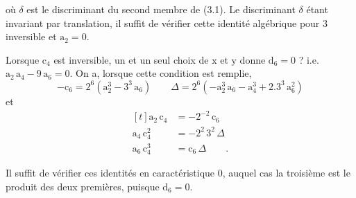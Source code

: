 où $\delta$ est le discriminant du second membre de (3.1). Le discriminant $\delta$ étant invariant par translation, il suffit de vérifier cette identité algébrique pour $3$ inversible et $\mathrm{a}_{2}=0$.

Lorsque $\mathrm{c}_{4}$ est inversible, un et un seul choix de $\mathrm{x}$ et $\mathrm{y}$ donne $\mathrm{d}_{6}=0$ ? i.e. $\mathrm{a}_{2}\,\mathrm{a}_{4}-9\,\mathrm{a}_{6}=0$. On a, lorsque cette condition est remplie,
\[
-\mathrm{c}_{6}=2^{6}(\mathrm{a}_{2}^{3}-3^{3}\,\mathrm{a}_{6})\qquad
\Delta=2^{6}(-\mathrm{a}_{2}^{3}\,\mathrm{a}_{6}-\mathrm{a}_{4}^{3}+2.3^{3}\,\mathrm{a}_{6}^{2})
\tag*{(3.3)}
\]
et
\[
\begin{aligned}[t]
\mathrm{a}_{2}\,\mathrm{c}_{4}&=-2^{-2}\,\mathrm{c}_{6}\\
\mathrm{a}_{4}\,\mathrm{c}_{4}^{2}&=-2^{2}\,3^{2}\,\Delta\\
\mathrm{a}_{6}\,\mathrm{c}_{4}^{3}&=\mathrm{c}_{6}\,\Delta\qquad.
\end{aligned}
\tag*{(3.4)}
\]

Il suffit de vérifier ces identités en caractéristique $0$, auquel cas la troisième est le produit des deux premières, puisque $\mathrm{d}_{6}=0$.

